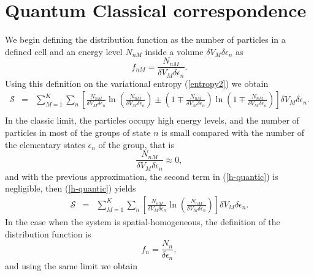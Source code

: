 \documentclass{article}
\newcommand{\de}{\delta}
\newcommand{\Ss}{\mathcal{S}}
\begin{document}
\section{Quantum Classical correspondence}
We begin defining the distribution function as the number of particles in a defined cell and an energy level $N_{nM}$ inside a volume $\de V_M \delta \epsilon_n$ as
\begin{equation}
    f_{nM}=\frac{N_{nM}}{ \de V_M \delta \epsilon_{n} }.
\end{equation}
Using this definition on the variational entropy (\ref{entropy2}) we obtain
\begin{eqnarray}
    \Ss&=& \sum_{M=1}^{K} \sum_n
    \left[  
           \frac{N_{nM}}{ \de V_M\delta \epsilon_{n}} \ln 
           \left( 
                  \frac{N_{nM}}{ \de V_M\delta \epsilon_{n}}
           \right)\pm 
           \left(  
                  1\mp \frac{N_{nM}}{ \de V_M \delta \epsilon_{n}}
           \right) \ln 
           \left(  
                   1\mp \frac{N_{nM}}{ \de V_M \delta \epsilon_{n}}
           \right)
    \right] \de V_M \delta \epsilon_{n}. \nonumber \\
    \label{h-quantic} 
\end{eqnarray}
In the classic limit, the particles occupy high energy levels, and the number of particles in most of the groups of state $n$ is small compared with the number of the elementary states $\epsilon_n$ of the group, that is
\begin{equation}
    \frac{N_{nM}}{ \de V_M \delta \epsilon_{n} } \approx 0,
\end{equation}
and with the previous approximation, the second term in (\ref{h-quantic}) is negligible, then (\ref{h-quantic}) yields
\begin{eqnarray}
    \Ss&=& \sum_{M=1}^{K} \sum_n
    \left[  
           \frac{N_{nM}}{ \de V_M \delta \epsilon_{n}} \ln 
           \left( 
                  \frac{N_{nM}}{ \de V_M \delta \epsilon_{n}}
           \right)
    \right] \de V_M \delta \epsilon_{n}. \label{h-quantic2}
\end{eqnarray}
In the case when the system is spatial-homogeneous, the definition of the distribution function is 
\begin{equation}
    f_{n}=\frac{N_{n}}{ \delta \epsilon_{n} },
\end{equation}
and using the same limit we obtain
\end{document}
